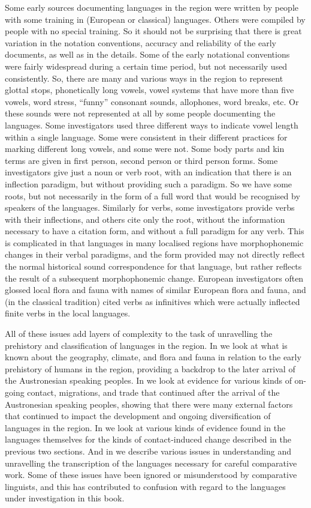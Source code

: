 Some early sources documenting languages in the region
were written by people with some training in (European or classical) languages.
Others were compiled by people with no special training.
So it should not be surprising that there is great variation in the notation conventions,
accuracy and reliability of the early documents,
as well as in the details.
Some of the early notational conventions were fairly widespread during a certain time period,
but not necessarily used consistently.
So, there are many
and various ways in the region to represent glottal stops,
phonetically long vowels, vowel systems that have more than five vowels,
word stress, ``funny'' consonant sounds, allophones, word breaks, etc.
Or these sounds were not represented at all by some people documenting the languages.
Some investigators used three different ways to indicate vowel length within a single language.
Some were consistent in their different practices for marking different long vowels,
and some were not.
Some body parts and kin terms are given in first person,
second person or third person forms.
Some investigators give just a noun or verb root,
with an indication that there is an inflection paradigm,
but without providing such a paradigm.
So we have some roots,
but not necessarily in the form of a full word that would be recognised by speakers of the languages.
Similarly for verbs, some investigators provide verbs with their inflections,
and others cite only the root,
without the information necessary to have a citation form,
and without a full paradigm for any verb.
This is complicated in that languages in many localised regions have morphophonemic changes in their
verbal paradigms, and the form provided may not directly reflect the normal historical sound correspondence for that language,
but rather reflects the result of a subsequent morphophonemic change.
European investigators often glossed local flora
and fauna with names of similar European flora
and fauna, and (in the classical tradition) cited verbs as infinitives which were actually inflected
finite verbs in the local languages.

All of these issues add layers of complexity to the task of unravelling the prehistory
and classification of languages in the region.
In  we look at what is known about the geography,
climate, and flora and fauna in relation to the early prehistory of humans in the region,
providing a backdrop to the later arrival of the Austronesian speaking peoples.
In  we look at evidence for various kinds of on-going contact,
migrations, and trade that continued after the arrival of the Austronesian speaking peoples,
showing that there were many external factors that continued to impact the development
and ongoing diversification of languages in the region.
In  we look at various kinds of evidence found in the languages themselves for the kinds of
contact-induced change described in the previous two sections.
And in  we describe various issues in understanding
and unravelling the transcription of the languages necessary for careful comparative work.
Some of these issues have been ignored or misunderstood by comparative linguists,
and this has contributed to confusion with regard to the languages under investigation in this book.

